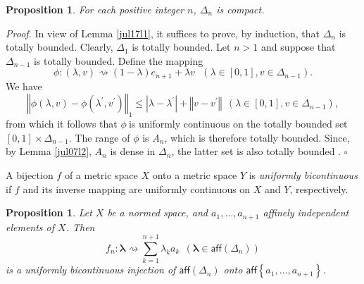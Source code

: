 \documentclass[11pt]{article}%
\newtheorem{proposition}[theorem]{Proposition}
\newenvironment{proof}[1][Proof]{\noindent\textit{#1.} }{}
\begin{document}
\begin{proposition}
\label{jul17p1}For each positive integer $n$, $\Delta_{n}$ is compact.
\end{proposition}

\begin{proof}
In view of Lemma \ref{jul17l1}, it suffices to prove, by induction, that
$\Delta_{n}$ is totally bounded. Clearly, $\Delta_{1}$ is totally bounded. Let
$n>1$ and suppose that $\Delta_{n-1}$ is totally bounded. Define the mapping
\[
\phi:\left(  \lambda,v\right)  \rightsquigarrow\left(  1-\lambda\right)
e_{n+1}+\lambda v\ \ \ \left(  \lambda\in\left[  0,1\right]  ,v\in\Delta
_{n-1}\right)  .
\]
We have
\[
\left\Vert \phi(\lambda,v)-\phi(\lambda^{\prime},v^{\prime})\right\Vert
_{1}\leq\left\vert \lambda-\lambda^{\prime}\right\vert +\left\Vert
v-v^{\prime}\right\Vert \ \ \left(  \lambda\in\left[  0,1\right]  ,v\in
\Delta_{n-1}\right)  ,
\]
from which it follows that $\phi\ $is uniformly continuous on the totally
bounded set $\left[  0,1\right]  \times\Delta_{n-1}$. The range of $\phi$ is
$A_{n}$, which is therefore totally bounded. Since, by Lemma \ref{jul07l2},
$A_{n}$ is dense in $\Delta_{n}$, the latter set is also totally bounded
\cite[2.2.6]{BVtech}.%
\hfill
$\square$
\end{proof}

A bijection $f$ of a metric space $X$ onto a metric space $Y$ is
\emph{uniformly bicontinuous }if $f$ and its inverse mapping are uniformly
continuous on $X$ and $Y$, respectively.

\begin{proposition}
\label{may29p1}Let $X$ be a normed space, and $a_{1},\ldots,a_{n+1}$ affinely
independent elements of $X$. Then%
\[
f_{n}:\mathbf{\lambda}\rightsquigarrow\sum_{k=1}^{n+1}\lambda_{k}%
a_{k}\ \ (\mathbf{\lambda}\in\mathsf{aff}(\Delta_{n}))
\]
is a uniformly bicontinuous injection of $\mathsf{aff}(\Delta_{n})$ onto
$\mathsf{aff}\left\{  a_{1},\ldots,a_{n+1}\right\}  $.
\end{proposition}
\end{document}
